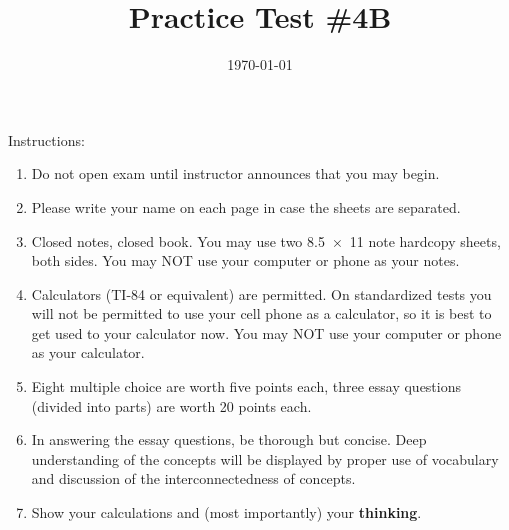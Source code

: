 \documentclass[exam,addpoints, noanswers]{exam}
\title{Practice Test \#4B}
\date{\today}
\author{\mobeardInstructorShort}
\begin{document}
\maketitle
\vfill
\mobeardExamNameBlock
\vfill
Instructions: 
\begin{enumerate}
\item Do not open exam until instructor announces that you may begin.
\item Please write your name on each page in case the sheets are separated. 
\item Closed notes, closed book.  You may use two \SI{8.5x11}{\inch} note hardcopy sheets, both sides. You may NOT use your computer or phone as your notes. 
\item Calculators (TI-84 or equivalent) are permitted.  On standardized tests you will not be permitted to use your cell phone as a calculator, so it is best to get used to your calculator now. You may NOT use your computer or phone as your calculator. 
\item Eight multiple choice are worth five points each, three essay questions (divided into parts) are worth 20 points each. 
\item In answering the essay questions, be thorough but concise. Deep understanding of the concepts will be displayed by proper use of vocabulary and discussion of the interconnectedness of concepts. 
\item Show your calculations and (most importantly) your \textbf{thinking}.
\end{enumerate}
\vfill
\begin{center}
\gradetable[h][questions]
\end{center}
\clearpage
\end{document}
